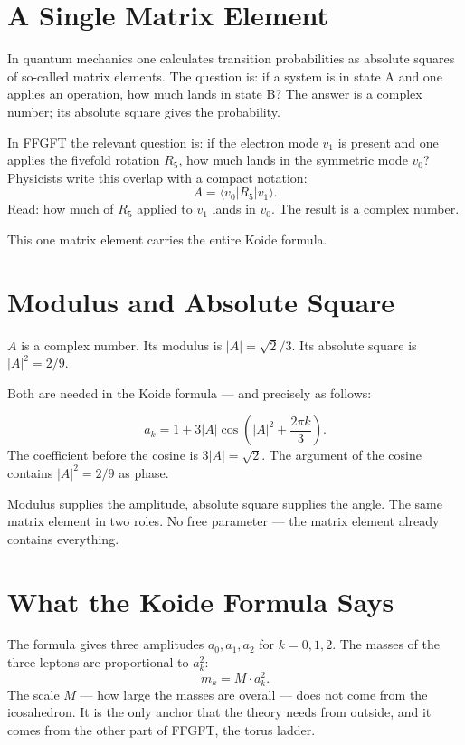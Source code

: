 \documentclass[12pt,oneside]{book}
\begin{document}
\section{A Single Matrix Element}

In quantum mechanics one calculates transition probabilities as absolute squares of so-called matrix elements. The question is: if a system is in state A and one applies an operation, how much lands in state B? The answer is a complex number; its absolute square gives the probability.

In FFGFT the relevant question is: if the electron mode $v_1$ is present and one applies the fivefold rotation $R_5$, how much lands in the symmetric mode $v_0$? Physicists write this overlap with a compact notation:
\[
A = \langle v_0 | R_5 | v_1 \rangle.
\]
Read: how much of $R_5$ applied to $v_1$ lands in $v_0$. The result is a complex number.

This one matrix element carries the entire Koide formula.

\section{Modulus and Absolute Square}

$A$ is a complex number. Its modulus is $|A| = \sqrt{2}/3$. Its absolute square is $|A|^2 = 2/9$.

Both are needed in the Koide formula --- and precisely as follows:
\begin{merkbox}
\[
a_k = 1 + 3|A| \cos\left(|A|^2 + \frac{2\pi k}{3}\right).
\]
The coefficient before the cosine is $3|A| = \sqrt{2}$. The argument of the cosine contains $|A|^2 = 2/9$ as phase.
\end{merkbox}

Modulus supplies the amplitude, absolute square supplies the angle. The same matrix element in two roles. No free parameter --- the matrix element already contains everything.

\section{What the Koide Formula Says}

The formula gives three amplitudes $a_0, a_1, a_2$ for $k = 0, 1, 2$. The masses of the three leptons are proportional to $a_k^2$:
\[
m_k = M \cdot a_k^2.
\]
The scale $M$ --- how large the masses are overall --- does not come from the icosa\-hedron. It is the only anchor that the theory needs from outside, and it comes from the other part of FFGFT, the torus ladder.
\end{document}
